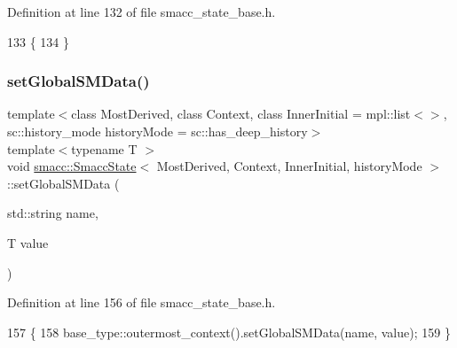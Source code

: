 Definition at line 132 of file smacc\+\_\+state\+\_\+base.\+h.


\begin{DoxyCode}
133     \{
134     \}
\end{DoxyCode}
\mbox{\label{classsmacc_1_1SmaccState_a98f2673b257479e0a3615d5d8279a591}} 
\subsubsection{\texorpdfstring{set\+Global\+S\+M\+Data()}{setGlobalSMData()}}
{\footnotesize\ttfamily template$<$class Most\+Derived, class Context, class Inner\+Initial = mpl\+::list$<$$>$, sc\+::history\+\_\+mode history\+Mode = sc\+::has\+\_\+deep\+\_\+history$>$ \\
template$<$typename T $>$ \\
void \hyperlink{classsmacc_1_1SmaccState}{smacc\+::\+Smacc\+State}$<$ Most\+Derived, Context, Inner\+Initial, history\+Mode $>$\+::set\+Global\+S\+M\+Data (\begin{DoxyParamCaption}\item[{std\+::string}]{name,  }\item[{T}]{value }\end{DoxyParamCaption})\hspace{0.3cm}{\ttfamily [inline]}}



Definition at line 156 of file smacc\+\_\+state\+\_\+base.\+h.


\begin{DoxyCode}
157     \{
158       base\_type::outermost\_context().setGlobalSMData(name, value);
159     \}
\end{DoxyCode}
\mbox{\label{classsmacc_1_1SmaccState_a1dccb401e1a99031863a21a590d953e6}} 
